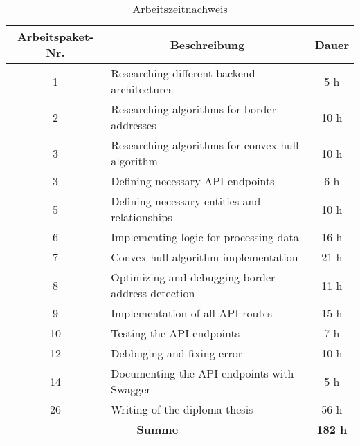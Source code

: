 \begin{table}[h!]
  \centering
  \begin{tabular}{|c|l|c|}
  \hline
  \multicolumn{1}{|c|}{\textbf{Arbeitspaket-Nr.}} &
  \multicolumn{1}{c|}{\textbf{Beschreibung}}  &
  \multicolumn{1}{c|}{\textbf{Dauer}}  \\ \hline
    1 & Researching different backend architectures & 5 h \\ \hline
    2 & Researching algorithms for border addresses & 10 h \\ \hline
    3 & Researching algorithms for convex hull algorithm & 10 h \\ \hline
    3 & Defining necessary API endpoints & 6 h \\ \hline
    5 & Defining necessary entities and relationships & 10 h \\ \hline
    6 & Implementing logic for processing data & 16 h \\ \hline
    7 & Convex hull algorithm implementation & 21 h \\ \hline
    8 & Optimizing and debugging border address detection & 11 h \\ \hline
    9 & Implementation of all API routes & 15 h \\ \hline
    10 & Testing the API endpoints & 7 h \\ \hline
    12 & Debbuging and fixing error & 10 h \\ \hline
    14 & Documenting the API endpoints with Swagger & 5 h \\ \hline
    26 & Writing of the diploma thesis & 56 h \\ \hline
    \multicolumn{2}{|c|}{\textbf{Summe}} & \textbf{182 h} \\ \hline
   \end{tabular}
  \caption{Arbeitszeitnachweis}
  \end{table}

\newpage




